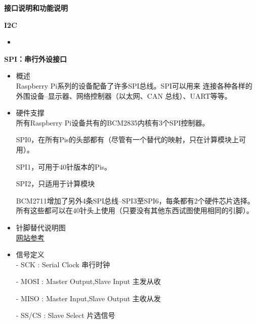 \documentclass[UTF8,14pt]{article}
\newcommand\sectionone[1]{\centerline{\Large{\bfseries{#1}}}}
\newcommand\sectiontwo[1]{\centerline{\large{\bfseries{#1}}}}
\begin{document}
\clearpage
\sectionone{接口说明和功能说明}
\begin{multicols}{2}
	\sectiontwo{I2C}
	\begin{itemize}
		\item
	\end{itemize}
	\sectiontwo{SPI：串行外设接口}
	\begin{itemize}
		\item 概述\\
		      Raspberry Pi系列的设备配备了许多SPI总线。SPI可以用来
		      连接各种各样的外围设备--显示器、网络控制器（以太网、CAN
		      总线）、UART等等。
		\item 硬件支撑\\
		      所有Raspberry Pi设备共有的BCM2835内核有3个SPI控制器。

		      SPI0，在所有Pis的头部都有（尽管有一个替代的映射，只在计算模块上可用）。

		      SPI1，可用于40针版本的Pis。

		      SPI2，只适用于计算模块

		      BCM2711增加了另外4条SPI总线--SPI3至SPI6，每条都有2个硬件芯片选择。所有这些都可以在40针头上使用（只要没有其他东西试图使用相同的引脚）。
		\item 针脚替代说明图\\
		      \href{https://www.raspberrypi.org/documentation/hardware/raspberrypi/spi/README.md}{网站参考}
		\item 信号定义\\
		      - SCK : Serial Clock 串行时钟

		      - MOSI : Master Output,Slave Input 主发从收

		      - MISO : Master Input,Slave Output 主收从发

		      - SS/CS : Slave Select 片选信号
	\end{itemize}
\end{multicols}
\end{document}
